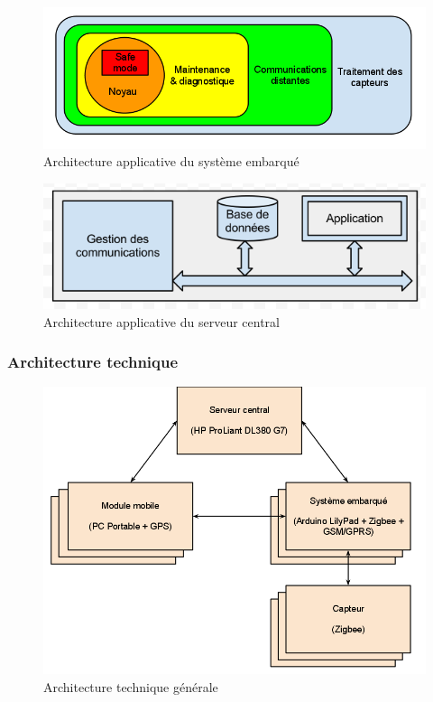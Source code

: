 \documentclass{mise_en_page}
\begin{document}
\begin{figure}[H]
	\centering
	\includegraphics[width=150mm]{archi_embarque.png}
	\caption{Architecture applicative du système embarqué}
\end{figure}

\begin{figure}[H]
	\centering
	\includegraphics[width=150mm]{archi_serveur.png}
	\caption{Architecture applicative du serveur central}
\end{figure}

\subsubsection{Architecture technique}

\begin{figure}[H]
	\centering
	\includegraphics[width=150mm]{archi_tech.png}
	\caption{Architecture technique générale}
\end{figure}
\end{document}
